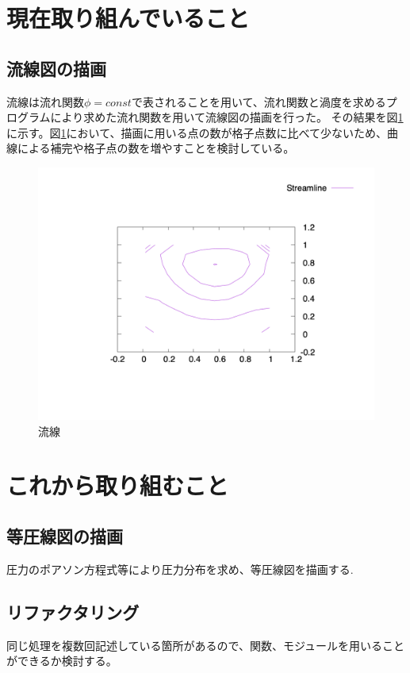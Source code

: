 \documentclass[upLaTeX,a4paper]{jsarticle}
\begin{document}
\section{現在取り組んでいること}
\subsection*{流線図の描画}
流線は流れ関数$\phi = const$で表されることを用いて、流れ関数と渦度を求めるプログラムにより求めた流れ関数を用いて流線図の描画を行った。
その結果を図\ref{fig:stream_line_50}に示す。図\ref{fig:stream_line_50}において、描画に用いる点の数が格子点数に比べて少ないため、曲線による補完や格子点の数を増やすことを検討している。
\begin{figure}[H]
  \includegraphics[width=15cm]{outputs/img/stream_line_50.png}
  \caption{流線}
  \label{fig:stream_line_50}
\end{figure}
\section{これから取り組むこと}
\subsection{等圧線図の描画}
圧力のポアソン方程式等により圧力分布を求め、等圧線図を描画する.

\subsection{リファクタリング}
同じ処理を複数回記述している箇所があるので、関数、モジュールを用いることができるか検討する。
\end{document}
